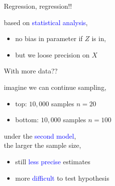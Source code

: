 %
%
\begin{lhframe}[rhgraphic={\texttt{[image: pipe1\_reg.png]}}]
	{Regression, regression!!}
	
	based on \textcolor{blue}{statistical analysis},
	\begin{itemize}
		\item no bias in parameter if $Z$ is in,
		\item but we loose precision on $X$
	\end{itemize}
\end{lhframe}
%
%


\begin{lhframe}[rhgraphic={\texttt{[image: pipe1\_samplesize.pdf]}}]
	{With more data??}
	
	imagine we can continue sampling,
	\begin{itemize}
		\item top: $10,000$ samples $n=20$
		\item bottom: $10,000$ samples $n=100$
	\end{itemize}
	
	under the \textcolor{blue}{second model}, \\
	the larger the sample size,
	\begin{itemize}
		\item still \textcolor{blue}{less precise} estimates
		\item more \textcolor{blue}{difficult} to test hypothesis
	\end{itemize}
\end{lhframe}
%
%


